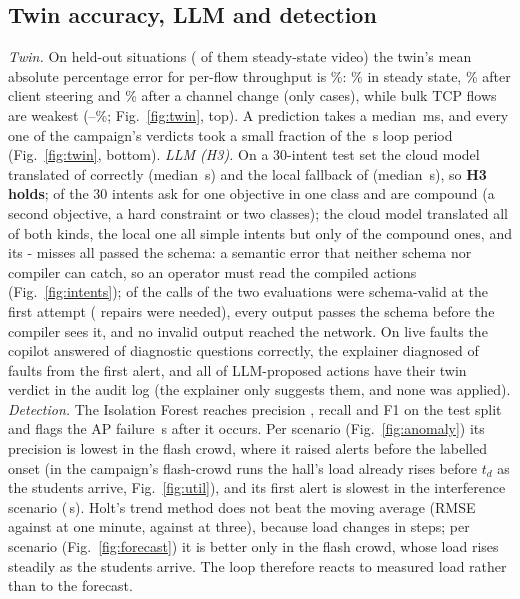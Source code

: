 \documentclass[conference]{IEEEtran}
\begin{document}
\subsection{Twin accuracy, LLM and detection}
\emph{Twin.} On \TwinN{} held-out situations (\TwinSteadyN{} of them steady-state video) the twin's mean absolute percentage error for per-flow throughput is \TwinMape\%: \TwinSteadyVideo\% in steady state, \TwinSteer\% after client steering and \TwinChannel\% after a channel change (only \TwinChannelN{} cases), while bulk TCP flows are weakest (\TwinBulkLow--\TwinBulkHigh\%; Fig.~\ref{fig:twin}, top). A prediction takes a median \SimMedianMs\,ms, and every one of the campaign's verdicts took a small fraction of the \CfgPeriod\,s loop period (Fig.~\ref{fig:twin}, bottom). \emph{LLM (H3).} On a 30-intent test set the cloud model translated \IntCloudOk{} of \IntCases{} correctly (median \IntCloudSeconds\,s) and the local fallback \IntLocalOk{} of \IntCases{} (median \IntLocalSeconds\,s), so \textbf{H3 holds}; of the 30 intents \IntSimple{} ask for one objective in one class and \IntCompound{} are compound (a second objective, a hard constraint or two classes); the cloud model translated all of both kinds, the local one all \IntLocalSimpleOk{} simple intents but only \IntLocalCompoundOk{} of the compound ones, and its \the\numexpr\IntCases-\IntLocalOk\relax{} misses all passed the schema: a semantic error that neither schema nor compiler can catch, so an operator must read the compiled actions (Fig.~\ref{fig:intents}); \IntFirstValid{} of the \IntCalls{} calls of the two evaluations were schema-valid at the first attempt (\IntRepairs{} repairs were needed), every output passes the schema before the compiler sees it, and no invalid output reached the network. On live faults the copilot answered \GenCopilotOk{} of \GenCopilotN{} diagnostic questions correctly, the explainer diagnosed \GenRcaOk{} of \GenRcaN{} faults from the first alert, and all \GenActionsVerdict{} of \GenActions{} LLM-proposed actions have their twin verdict in the audit log (the explainer only suggests them, and none was applied). \emph{Detection.} The Isolation Forest reaches precision \AnoPrecision, recall \AnoRecall{} and F1 \AnoF{} on the test split and flags the AP failure \AnoDelayFail\,s after it occurs. Per scenario (Fig.~\ref{fig:anomaly}) its precision is lowest in the flash crowd, where it raised alerts before the labelled onset (in the campaign's flash-crowd runs the hall's load already rises before $t_d$ as the students arrive, Fig.~\ref{fig:util}), and its first alert is slowest in the interference scenario (\AnoDelayCochan\,s). Holt's trend method does not beat the moving average (RMSE \FcHoltOne{} against \FcMaOne{} at one minute, \FcHoltThree{} against \FcMaThree{} at three), because load changes in steps; per scenario (Fig.~\ref{fig:forecast}) it is better only in the flash crowd, whose load rises steadily as the students arrive. The loop therefore reacts to measured load rather than to the forecast.
\end{document}
